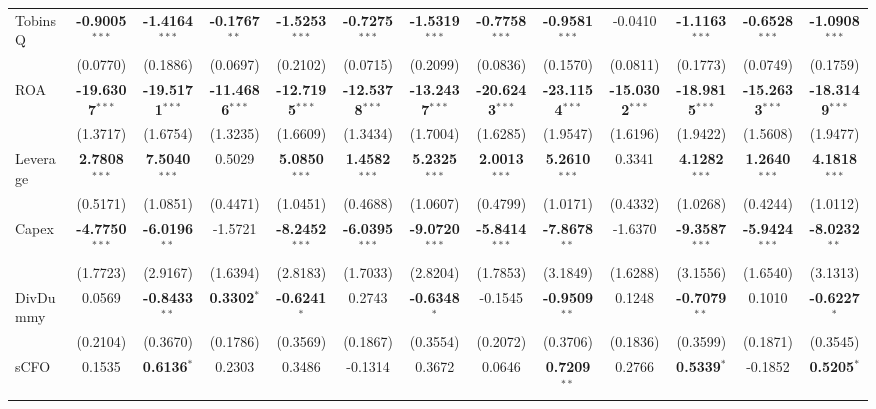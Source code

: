 \documentclass[11pt,a4paper]{article}
\begin{document}
\begin{table}[htbp]
\begin{tabular}{lcccccccccccc}
TobinsQ & \textbf{-0.9005}$^{***}$ & \textbf{-1.4164}$^{***}$ & \textbf{-0.1767}$^{**}$ & \textbf{-1.5253}$^{***}$ & \textbf{-0.7275}$^{***}$ & \textbf{-1.5319}$^{***}$ & \textbf{-0.7758}$^{***}$ & \textbf{-0.9581}$^{***}$ & -0.0410 & \textbf{-1.1163}$^{***}$ & \textbf{-0.6528}$^{***}$ & \textbf{-1.0908}$^{***}$ \\
 & (0.0770) & (0.1886) & (0.0697) & (0.2102) & (0.0715) & (0.2099) & (0.0836) & (0.1570) & (0.0811) & (0.1773) & (0.0749) & (0.1759) \\
ROA & \textbf{-19.6307}$^{***}$ & \textbf{-19.5171}$^{***}$ & \textbf{-11.4686}$^{***}$ & \textbf{-12.7195}$^{***}$ & \textbf{-12.5378}$^{***}$ & \textbf{-13.2437}$^{***}$ & \textbf{-20.6243}$^{***}$ & \textbf{-23.1154}$^{***}$ & \textbf{-15.0302}$^{***}$ & \textbf{-18.9815}$^{***}$ & \textbf{-15.2633}$^{***}$ & \textbf{-18.3149}$^{***}$ \\
 & (1.3717) & (1.6754) & (1.3235) & (1.6609) & (1.3434) & (1.7004) & (1.6285) & (1.9547) & (1.6196) & (1.9422) & (1.5608) & (1.9477) \\
Leverage & \textbf{2.7808}$^{***}$ & \textbf{7.5040}$^{***}$ & 0.5029 & \textbf{5.0850}$^{***}$ & \textbf{1.4582}$^{***}$ & \textbf{5.2325}$^{***}$ & \textbf{2.0013}$^{***}$ & \textbf{5.2610}$^{***}$ & 0.3341 & \textbf{4.1282}$^{***}$ & \textbf{1.2640}$^{***}$ & \textbf{4.1818}$^{***}$ \\
 & (0.5171) & (1.0851) & (0.4471) & (1.0451) & (0.4688) & (1.0607) & (0.4799) & (1.0171) & (0.4332) & (1.0268) & (0.4244) & (1.0112) \\
Capex & \textbf{-4.7750}$^{***}$ & \textbf{-6.0196}$^{**}$ & -1.5721 & \textbf{-8.2452}$^{***}$ & \textbf{-6.0395}$^{***}$ & \textbf{-9.0720}$^{***}$ & \textbf{-5.8414}$^{***}$ & \textbf{-7.8678}$^{**}$ & -1.6370 & \textbf{-9.3587}$^{***}$ & \textbf{-5.9424}$^{***}$ & \textbf{-8.0232}$^{**}$ \\
 & (1.7723) & (2.9167) & (1.6394) & (2.8183) & (1.7033) & (2.8204) & (1.7853) & (3.1849) & (1.6288) & (3.1556) & (1.6540) & (3.1313) \\
DivDummy & 0.0569 & \textbf{-0.8433}$^{**}$ & \textbf{0.3302}$^{*}$ & \textbf{-0.6241}$^{*}$ & 0.2743 & \textbf{-0.6348}$^{*}$ & -0.1545 & \textbf{-0.9509}$^{**}$ & 0.1248 & \textbf{-0.7079}$^{**}$ & 0.1010 & \textbf{-0.6227}$^{*}$ \\
 & (0.2104) & (0.3670) & (0.1786) & (0.3569) & (0.1867) & (0.3554) & (0.2072) & (0.3706) & (0.1836) & (0.3599) & (0.1871) & (0.3545) \\
sCFO & 0.1535 & \textbf{0.6136}$^{*}$ & 0.2303 & 0.3486 & -0.1314 & 0.3672 & 0.0646 & \textbf{0.7209}$^{**}$ & 0.2766 & \textbf{0.5339}$^{*}$ & -0.1852 & \textbf{0.5205}$^{*}$ \\

\end{tabular}
\end{table}
\end{document}
